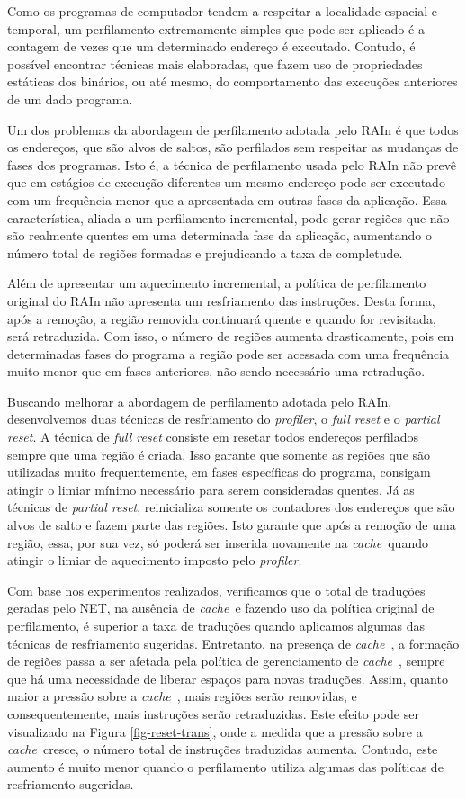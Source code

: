 \documentclass[11pt,twoside]{article}
\newcommand{\cache}{\emph{cache}}
\begin{document}
Como os programas de computador tendem a respeitar a localidade espacial e temporal, um perfilamento extremamente simples que pode ser aplicado é a contagem de vezes que um determinado endereço é executado. Contudo, é possível encontrar técnicas mais elaboradas, que fazem uso de propriedades estáticas dos binários, ou até mesmo, do comportamento das execuções anteriores de um dado programa.

Um dos problemas da abordagem de perfilamento adotada pelo RAIn é que todos os endereços, que são alvos de saltos, são perfilados sem respeitar as mudanças de fases dos programas. Isto é, a técnica de perfilamento usada pelo RAIn não prevê que em estágios de execução diferentes um mesmo endereço pode ser executado com um frequência menor que a apresentada em outras fases da aplicação. Essa característica, aliada a um perfilamento incremental, pode gerar regiões que não são realmente quentes em uma determinada fase da aplicação, aumentando o número total de regiões formadas e prejudicando a taxa de completude.

Além de apresentar um aquecimento incremental, a política de perfilamento original do RAIn não apresenta um resfriamento das instruções. Desta forma, após a remoção, a região removida continuará quente e quando for revisitada, será retraduzida.  Com isso, o número de regiões aumenta drasticamente, pois em determinadas fases do programa a região pode ser acessada com uma frequência muito menor que em fases anteriores, não sendo necessário uma retradução.

Buscando melhorar a abordagem de perfilamento adotada pelo RAIn, desenvolvemos duas técnicas de resfriamento do \emph{profiler}, o \emph{full reset} e o \emph{partial reset}. A técnica de \emph{full reset} consiste em resetar todos endereços perfilados sempre que uma região é criada. Isso garante que somente as regiões que são utilizadas muito frequentemente, em fases específicas do programa, consigam atingir o limiar mínimo necessário para serem consideradas quentes. Já as técnicas de \emph{partial reset}, reinicializa somente os contadores dos endereços que são alvos de salto e fazem parte das regiões. Isto garante que após a remoção de uma região, essa, por sua vez, só  poderá ser inserida novamente na \cache~quando atingir o limiar de aquecimento imposto pelo \emph{profiler}.

Com base nos experimentos realizados, verificamos que o total de traduções geradas pelo NET, na ausência de \cache~e fazendo uso da política original de perfilamento, é superior a taxa de traduções quando aplicamos algumas das técnicas de resfriamento sugeridas. Entretanto, na presença de \cache~, a formação de regiões passa a ser afetada pela política de gerenciamento de \cache~, sempre que há uma necessidade de liberar espaços para novas traduções. Assim, quanto maior a pressão sobre a \cache~, mais regiões serão removidas, e consequentemente, mais instruções serão retraduzidas. Este efeito pode ser visualizado na Figura \ref{fig-reset-trans}, onde a medida que a pressão sobre a \cache~cresce, o número total de instruções traduzidas aumenta. Contudo, este aumento é muito menor quando o perfilamento utiliza algumas das políticas de resfriamento sugeridas.
\end{document}
